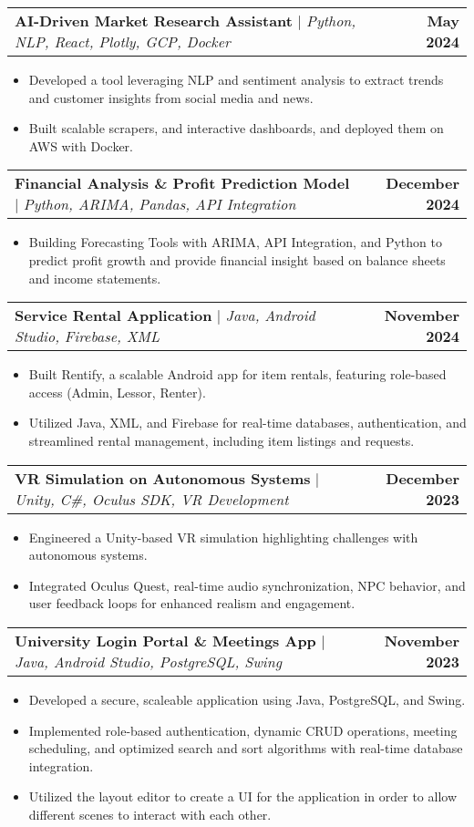 \documentclass[letterpaper,11pt]{article}
\makeatletter
\newcommand{\resumeItem}[1]{
  \item\small{
    {#1 \vspace{-2pt}}
  }
}
\newcommand{\resumeProjectHeading}[2]{
    \item
    \begin{tabular*}{1.001\textwidth}{l@{\extracolsep{\fill}}r}
      \small#1 & \textbf{\small #2}\\
    \end{tabular*}\vspace{-7pt}
}
\newcommand{\resumeItemListStart}{\begin{itemize}}
\newcommand{\resumeItemListEnd}{\end{itemize}\vspace{-5pt}}
\makeatother
\begin{document}
		   \resumeProjectHeading
				{\textbf{AI-Driven Market Research Assistant} $|$ \emph{Python, NLP, React, Plotly, GCP, Docker}}{May 2024}
				\resumeItemListStart
				\resumeItem{Developed a tool leveraging NLP and sentiment analysis to extract trends and customer insights from social media and news.}
				\resumeItem{Built scalable scrapers, and interactive dashboards, and deployed them on AWS with Docker.}
		 	\resumeItemListEnd
		 	
			  \vspace{-13pt}
	          \resumeProjectHeading
	          {\textbf{Financial Analysis \& Profit Prediction Model} $|$ \emph{Python, ARIMA, Pandas, API Integration}}{December 2024}
	          \resumeItemListStart
	          \resumeItem{Building Forecasting Tools with ARIMA, API Integration, 
	          	and Python to predict profit growth and provide financial insight based on balance sheets and income statements.}
          \resumeItemListEnd 
          
          \vspace{-13pt}
          \resumeProjectHeading
          {\textbf{Service Rental Application} $|$ \emph{Java, Android Studio, Firebase, XML}}{November 2024}
          \resumeItemListStart
          \resumeItem{Built Rentify, a scalable Android app for item rentals, featuring role-based 
          	access (Admin, Lessor, Renter).}
          \resumeItem{ Utilized Java, XML, and Firebase for real-time databases, authentication, and 
          	streamlined rental management, including item listings and requests.}
          \resumeItemListEnd  
		  
		    \vspace{-13pt}
		  \resumeProjectHeading
		  {\textbf{VR Simulation on Autonomous Systems} $|$ \emph{Unity, C\#, Oculus SDK, VR Development}}{December 2023}
		  \resumeItemListStart
		  \resumeItem{Engineered a Unity-based VR simulation highlighting challenges with autonomous systems.}
		  \resumeItem{ Integrated Oculus Quest, real-time audio synchronization, NPC behavior, and 
		  	user feedback loops for enhanced realism and engagement.}
		  \resumeItemListEnd
		  
		  \vspace{-13pt}
		  \resumeProjectHeading
		  {\textbf{University Login Portal \& Meetings App} $|$ \emph{Java, Android Studio, PostgreSQL, Swing}}{November 2023}
		  \resumeItemListStart
		  \resumeItem{Developed a secure, scaleable application using Java, PostgreSQL, and Swing.}
		  \resumeItem{Implemented role-based authentication, dynamic CRUD operations, meeting scheduling, 
		  	and optimized search and sort algorithms with real-time database integration.}
		  \resumeItem{Utilized the layout editor to create a UI for the application in order to allow different scenes to interact with each other.}
		  \resumeItemListEnd 
		  
\end{document}
